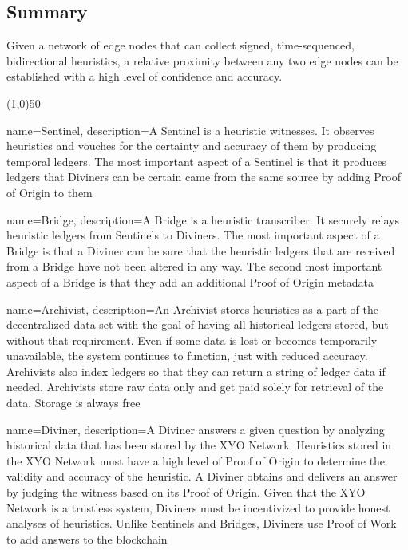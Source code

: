 \documentclass{article}
\begin{document}
\subsection {Summary}
Given a network of edge nodes that can collect signed, time-sequenced, bidirectional \glspl{heuristic}, a relative proximity between any two edge nodes can be established with a high level of confidence and \gls{accuracy}.

\begin{center}
\line(1,0){50}
\end{center}



\clearpage



{
    name={Sentinel},
    description={A Sentinel is a heuristic witnesses. It observes heuristics and vouches for the certainty and accuracy of them by producing temporal ledgers. The most important aspect of a Sentinel is that it produces ledgers that Diviners can be certain came from the same source by adding Proof of Origin to them}
}

{
    name={Bridge},
    description={A Bridge is a heuristic transcriber. It securely relays heuristic ledgers from Sentinels to Diviners. The most important aspect of a Bridge is that a Diviner can be sure that the heuristic ledgers that are received from a Bridge have not been altered in any way. The second most important aspect of a Bridge is that they add an additional Proof of Origin metadata}
}

{
    name={Archivist},
    description={An Archivist stores heuristics as a part of the decentralized data set with the goal of having all historical ledgers stored, but without that requirement. Even if some data is lost or becomes temporarily unavailable, the system continues to function, just with reduced accuracy. Archivists also index ledgers so that they can return a string of ledger data if needed. Archivists store raw data only and get paid solely for retrieval of the data. Storage is always free}
}

{
    name={Diviner},
    description={A Diviner answers a given question by analyzing historical data that has been stored by the XYO Network. Heuristics stored in the XYO Network must have a high level of Proof of Origin to determine the validity and accuracy of the heuristic. A Diviner obtains and delivers an answer by judging the witness based on its Proof of Origin. Given that the XYO Network is a trustless system, Diviners must be incentivized to provide honest analyses of heuristics. Unlike Sentinels and Bridges, Diviners use Proof of Work to add answers to the blockchain}
}
\end{document}
